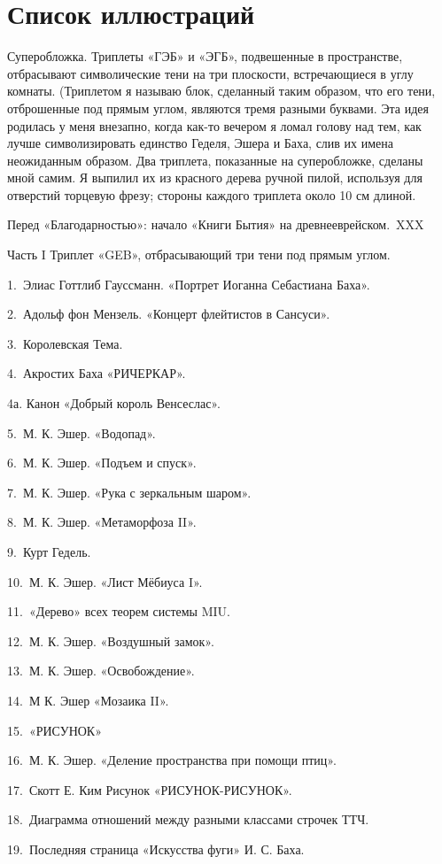 \documentclass[../main.tex]{subfiles}
\begin{document}
\section{Список иллюстраций}

Суперобложка. Триплеты «ГЭБ» и «ЭГБ», подвешенные в пространстве, отбрасывают символические тени на три плоскости, встречающиеся в углу комнаты. (Триплетом я называю блок, сделанный таким образом, что его тени, отброшенные под прямым углом, являются тремя разными буквами. Эта идея родилась у меня внезапно, когда как-то вечером я ломал голову над тем, как лучше символизировать единство Геделя, Эшера и Баха, слив их имена неожиданным образом. Два триплета, показанные на суперобложке, сделаны мной самим. Я выпилил их из красного дерева ручной пилой, используя для отверстий торцевую фрезу; стороны каждого триплета около 10 см длиной.

Перед «Благодарностью»: начало «Книги Бытия» на древнееврейском.~XXX

Часть I Триплет «GEB», отбрасывающий три тени под прямым углом.

1.~Элиас Готтлиб Гауссманн. «Портрет Иоганна Себастиана Баха».

2.~Адольф фон Мензель. «Концерт флейтистов в Сансуси».

3.~Королевская Тема.

4.~Акростих Баха «РИЧЕРКАР».

4а. Канон «Добрый король Венсеслас».

5.~М. К. Эшер. «Водопад».

6.~М. К. Эшер. «Подъем и спуск».

7.~М. К. Эшер. «Рука с зеркальным шаром».

8.~М. К. Эшер. «Метаморфоза II».

9.~Курт Гедель.

10.~М. К. Эшер. «Лист Мёбиуса I».

11.~«Дерево» всех теорем системы MIU.

12.~М. К. Эшер. «Воздушный замок».

13.~М. К. Эшер. «Освобождение».

14.~М К. Эшер «Мозаика II».

15.~«РИСУНОК»

16.~М. К. Эшер. «Деление пространства при помощи птиц».

17.~Скотт Е. Ким Рисунок «РИСУНОК-РИСУНОК».

18.~Диаграмма отношений между разными классами строчек ТТЧ.

19.~Последняя страница «Искусства фуги» И. С. Баха.
\end{document}
